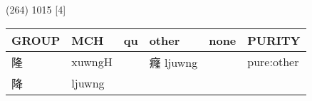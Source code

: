 \documentclass[14pt,a4paper]{scrartcl}
\begin{document}
(264) 1015 {[}4{]}

\begin{longtable}[c]{@{}llllll@{}}
\toprule
\begin{minipage}[b]{0.14\columnwidth}\raggedright\strut
GROUP
\strut\end{minipage} &
\begin{minipage}[b]{0.14\columnwidth}\raggedright\strut
MCH
\strut\end{minipage} &
\begin{minipage}[b]{0.14\columnwidth}\raggedright\strut
qu
\strut\end{minipage} &
\begin{minipage}[b]{0.14\columnwidth}\raggedright\strut
other
\strut\end{minipage} &
\begin{minipage}[b]{0.14\columnwidth}\raggedright\strut
none
\strut\end{minipage} &
\begin{minipage}[b]{0.14\columnwidth}\raggedright\strut
PURITY
\strut\end{minipage}\tabularnewline
\midrule
\endhead
\begin{minipage}[t]{0.14\columnwidth}\raggedright\strut
隆
\strut\end{minipage} &
\begin{minipage}[t]{0.14\columnwidth}\raggedright\strut
xuwngH
\strut\end{minipage} &
\begin{minipage}[t]{0.14\columnwidth}\raggedright\strut
\strut\end{minipage} &
\begin{minipage}[t]{0.14\columnwidth}\raggedright\strut
癃 ljuwng
\strut\end{minipage} &
\begin{minipage}[t]{0.14\columnwidth}\raggedright\strut
\strut\end{minipage} &
\begin{minipage}[t]{0.14\columnwidth}\raggedright\strut
pure:other
\strut\end{minipage}\tabularnewline
\begin{minipage}[t]{0.14\columnwidth}\raggedright\strut
降
\strut\end{minipage} &
\begin{minipage}[t]{0.14\columnwidth}\raggedright\strut
ljuwng
\strut\end{minipage} &
\begin{minipage}[t]{0.14\columnwidth}\raggedright\strut
\strut\end{minipage} &

\end{longtable}
\end{document}
